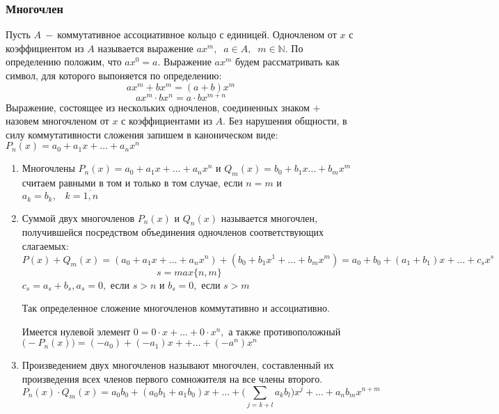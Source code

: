 \subsubsection{Многочлен}
Пусть $A~-~$коммутативное ассоциативное кольцо с единицей. Одночленом от $x$ с коэффициентом из $A$ называется выражение $ax^m, \;\;a\in A, \;\;m\in \mathbb{N}$. По определению положим, что $ax^0=a$. Выражение $ax^m$ будем рассматривать как символ, для которого выпоняется по определению: $$ax^m+bx^m=(a+b)x^m$$
$$ax^m\cdot bx^n= a \cdot b x^{m+n}$$
Выражение, состоящее из нескольких одночленов, соединенных знаком $+$ назовем многочленом от $x$ с коэффициентами из $A$. Без нарушения общности, в силу коммутативности сложения запишем в каноническом виде: $P_n(x)=a_0+a_1x+\dots+a_nx^n$
\begin{enumerate}
    \item\label{1} Многочлены $P_n(x)=a_0+a_1x+\dots+a_nx^n$ и $Q_m(x)=b_0+b_1x\dots+b_mx^m $ считаем равными в том и только в том случае,  если $n=m$ и $a_k=b_k, \;\;\;k=\overline{1, n}$
    \item Суммой двух многочленов $P_n(x)$ и $Q_n(x)$ называется многочлен, получившейся посредством объединения одночленов соответствующих слагаемых:$$P(x)+Q_m(x)=(a_0+a_1x+\dots+a_nx^n)+(b_0+b_1x^1+\dots+b_mx^m)=a_0+b_0+ (a_1+b_1)x+\dots+c_sx^s$$ 
    $$s=max\{n, m\} $$
    $c_s=a_s+b_s, a_s=0, $ если $s>n$ и $b_s=0, $ если $s>m$\par Так определенное сложение многочленов коммутативно и ассоциативно.\par Имеется нулевой элемент $0=0 \cdot x + \dots + 0 \cdot x^n, $ а также противоположный $\big(-P_n(x)\big)=(-a_0)+(-a_1)x++\dots+(-a^n)x^n$
    \item Произведением двух многочленов называют многочлен, составленный их произведения всех членов первого сомножителя на все члены второго.
    $$P_n(x)\cdot Q_m(x)=a_0b_0+(a_0b_1+a_1b_0)x+\dots+\Big(\displaystyle\sum_{j=k+l}a_kb_l \Big)x^j+\dots+a_nb_mx^{n+m}$$
    
\end{enumerate}
